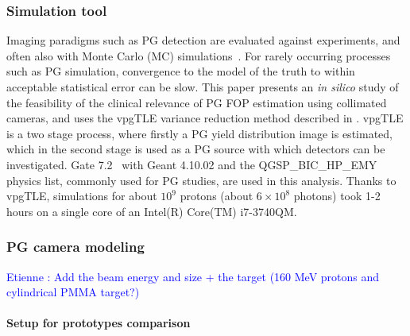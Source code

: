 \documentclass[a4paper,english]{article}
\newcommand{\tcb}[1]{\textcolor{blue}{#1}}
\begin{document}
\subsubsection{Simulation tool}

Imaging paradigms such as PG detection are evaluated against experiments, and often also with Monte Carlo (MC) simulations~\citep{Moteabbed2011,Gueth2013,Robert2013,Golnik2014a,Janssen2014}. For rarely occurring processes such as PG simulation, convergence to the model of the truth to within acceptable statistical error can be slow. This paper presents an \emph{in silico} study of the feasibility of the clinical relevance of PG FOP estimation using collimated cameras, and uses the vpgTLE variance reduction method described in \cite{Huisman2016}. vpgTLE is a two stage process, where firstly a PG yield distribution image is estimated, which in the second stage is used as a PG source with which detectors can be investigated. Gate 7.2~\citep{Sarrut2014} with Geant 4.10.02 and the QGSP\_BIC\_HP\_EMY physics list, commonly used for PG studies, are used in this analysis. Thanks to vpgTLE, simulations for about $10^9$ protons (about $6\times10^8$ photons) took 1-2 hours on a single core of an Intel(R) Core(TM) i7-3740QM.

\subsubsection{PG camera modeling}\label{sec:camera}

\tcb{Etienne : Add the beam energy and size + the target (160 MeV protons and cylindrical PMMA target?)}
	
\paragraph{Setup for prototypes comparison}
\end{document}
